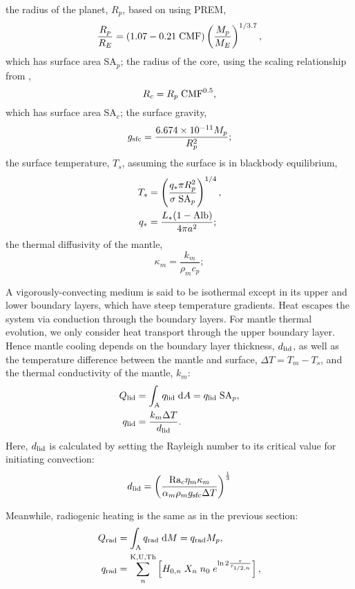 \documentclass[10pt,a4paper]{article}
\begin{document}
the radius of the planet, $R_p$, based on \citet{Zeng2016} using PREM,
\begin{equation}
\frac{R_p}{R_E} = (1.07 - 0.21\; {\rm CMF})\left(\frac{M_p}{M_E}\right)^{1/3.7},
\end{equation}
which has surface area SA$_p$; the radius of the core, using the scaling relationship from \citet{Zeng2017},
\begin{equation}
R_c = R_p \; {\rm CMF}^{0.5},
\end{equation}
which has surface area SA$_c$; the surface gravity,
\begin{equation}
g_{\rm sfc} =\frac{6.674\times 10^{-11}M_p}{R_p^2};
\end{equation}
the surface temperature, $T_s$, assuming the surface is in blackbody equilibrium,
\begin{align}
T_s &= \left(\frac{q_* \pi R_p^2}{\sigma \; {\rm SA}_p}\right)^{1/4},\\
q_* &= \frac{L_*(1-{\rm Alb})}{4 \pi a^2};
\end{align}
the thermal diffusivity of the mantle,
\begin{equation}
\kappa_m = \frac{k_m}{\rho_m c_p};
\end{equation}

A vigorously-convecting medium is said to be isothermal except in its upper and lower boundary layers, which have steep temperature gradients.  Heat escapes the system via conduction through the boundary layers. For mantle thermal evolution, we only consider heat transport through the upper boundary layer. Hence mantle cooling depends on the boundary layer thickness, $d_{\rm lid}$, as well as the temperature difference between the mantle and surface, $\Delta T = T_m - T_s$, and the thermal conductivity of the mantle, $k_m$:
\begin{align}
Q_{\rm lid} &= \int_{\rm A} q_{\rm lid} \; {\rm d}A = q_{\rm lid} \; {\rm SA}_p,\\
q_{\rm lid} &= \frac{k_m \Delta T}{d_{\rm lid}}.
\end{align}
Here, $d_{\rm lid}$ is calculated by setting the Rayleigh number to its critical value for initiating convection:
\begin{equation}
d_{\rm lid} = \left(\frac{{\rm Ra}_c \eta_m \kappa_m}{\alpha_m \rho_m g_{\rm sfc} \Delta T}\right)^{\frac{1}{3}}
\end{equation}

Meanwhile, radiogenic heating is the same as in the previous section:
\begin{align}
Q_{\rm rad} &= \int_{\rm A} q_{\rm rad} \; {\rm d}M = q_{\rm rad} M_p,\\
q_{\rm rad} &= \sum^{\rm K, U, Th}_n \left[ H_{0, n} \; X_n \; n_0 \; e^{\ln 2 \frac{\tau}{\tau_{1/2 ,n}}} \right],
\end{align}
\end{document}
